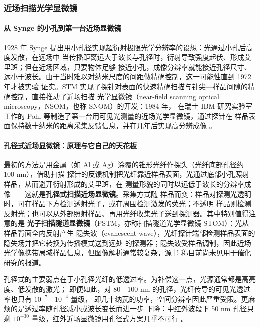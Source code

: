\subsubsection{近场扫描光学显微镜}
\label{ssec:nsom}

\paragraph{从 Synge 的小孔到第一台近场显微镜}
1928 年 Synge 提出用小孔径实现超衍射极限光学分辨率的设想：光通过小孔后高度发散，在远场中
当传播距离远大于波长与孔径时，衍射导致强度起伏、形成艾里斑；但在近场区域，只要物体足够
接近小孔，成像分辨率就能接近孔径尺寸、远小于波长。由于当时难以对纳米尺度的间距做精确控制，这一可能性直到 1972 年才被实验
证实。STM 实现了探针对表面的快速精确扫描与针尖—样品间隙的精确控制，直接推动了近场扫描
光学显微镜（near-field scanning optical microscopy，NSOM，也称 SNOM）的开发：1984 年，
在瑞士 IBM 研究实验室工作的 Pohl 等制造了第一台用可见光测量的近场光学显微镜，通过探针在
样品表面保持数十纳米的距离采集反馈信息，并在几年后实现高分辨成像
。

\paragraph{孔径式近场显微镜：原理与它自己的天花板}
最初的方法是用金属（如 Al 或 Ag）涂覆的锥形光纤作探头（光纤底部孔径约 100 nm），借助扫描
探针的反馈机制把光纤靠近样品表面，光通过底部小孔照射样品，从而避开衍射形成的艾里斑，在
测量形貌的同时以远低于波长的分辨率成像——这就是\textbf{孔径式扫描近场显微镜}。采集方式随
样品而变：样品对探测光透明时，可在样品下方检测透射光子，或在周围检测激发的荧光；不透明
样品则检测反射光；也可以从外部照射样品、再用光纤收集光子送到探测器。其中特别值得注意的是
\textbf{光子扫描隧道显微镜}（PSTM，亦称扫描隧道光学显微镜 STOM）：光从样品背面全内反射产生
隐失波（evanescent wave），光纤探针端部检测样品表面的隐失场并把它转换为传播模式送到远处
的探测器；隐失波受样品调制，因此近场光学像携带局域样品信息，但图像解析通常较复杂，源书
称目前尚未见用于催化研究的报道。

孔径式的主要弱点在于小孔径光纤的低透过率。为补偿这一点，光源通常都是高亮度、低发散的激光；
即便如此，对 80—100 nm 的孔径，光纤传导的可见光透过率也只有 $10^{-7}$—$10^{-4}$ 量级，
即几十纳瓦的功率，空间分辨率因此严重受限。更麻烦的是透过率随孔径减小或波长变长而进一步
下降：中红外波段下 50 nm 孔径只剩 $10^{-30}$ 量级，红外近场显微镜用孔径式方案几乎不可行
。

